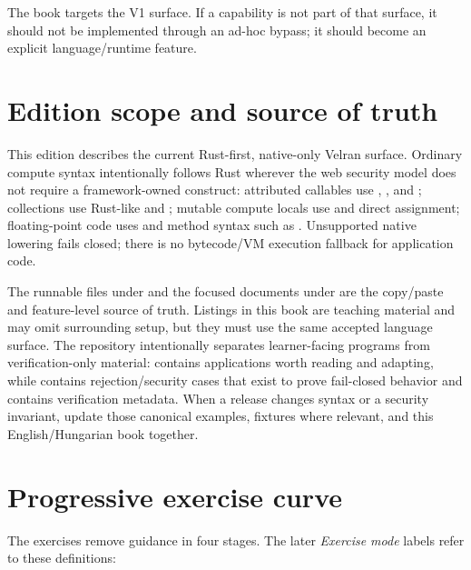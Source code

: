 The book targets the V1 surface. If a capability is not part of that surface, it should not be implemented through an ad-hoc bypass; it should become an explicit language/runtime feature.

\section*{Edition scope and source of truth}

This edition describes the current Rust-first, native-only Velran surface. Ordinary compute syntax intentionally follows Rust wherever the web security model does not require a framework-owned construct: attributed callables use , , and ; collections use Rust-like  and ; mutable compute locals use  and direct assignment; floating-point code uses  and method syntax such as . Unsupported native lowering fails closed; there is no bytecode/VM execution fallback for application code.

The runnable files under  and the focused documents under  are the copy/paste and feature-level source of truth. Listings in this book are teaching material and may omit surrounding setup, but they must use the same accepted language surface. The repository intentionally separates learner-facing programs from verification-only material:  contains applications worth reading and adapting, while  contains rejection/security cases that exist to prove fail-closed behavior and  contains verification metadata. When a release changes syntax or a security invariant, update those canonical examples, fixtures where relevant, and this English/Hungarian book together.


\section*{Progressive exercise curve}
The exercises remove guidance in four stages. The later \emph{Exercise mode} labels refer to these definitions:

